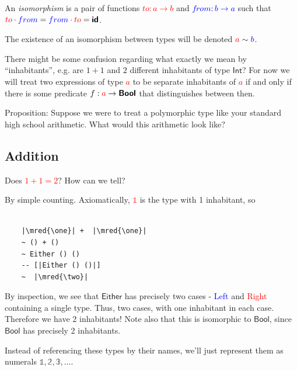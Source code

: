 \documentclass[tikz]{beamer}
\newcommand{\cat}[1]{\bm{ \mathsf{#1} }}
\newcommand{\one}{\bm{\mathbb{1}}}
\newcommand{\two}{\bm{\mathbb{2}}}
\newcommand{\three}{\bm{\mathbb{3}}}
\newcommand{\red}[1]{\textcolor{red}{#1}}
\newcommand{\mred}[1]{\textcolor{red}{$#1$}}
\newcommand{\blue}[1]{\textcolor{blue}{#1}}
\newcommand{\mblue}[1]{\textcolor{blue}{$#1$}}
\theoremstyle{definition}
\begin{document}
\frame
{
	
	\begin{definition}[Isomorphism]
	
		An \textit{isomorphism} is a pair of functions \mred{to : a \to b} and \mblue{from : b \to a} such that $\red{to} \cdot \blue{from} = \blue{from} \cdot \red{to} = \cat{id}$. 
		
		The existence of an isomorphism between types will be denoted $\red{a}  \sim \blue{b}$. 
		
	\end{definition}
}


\frame
{
	There might be some confusion regarding what exactly we mean by “inhabitants”, e.g. are $1 + 1$ and $2$ different inhabitants of type $\cat{Int}$? For now we will treat two expressions of type \mred{a} to be separate inhabitants of \mred{a} if and only if there is some predicate $f : \red{a} \to \cat{Bool}$ that distinguishes between then. 
}

\frame
{ 
	Proposition: Suppose we were to treat a polymorphic type like your standard high school arithmetic. What would this arithmetic look like? 
}

\subsection{Addition}

\frame
{ 
	Does \mred{1 + 1 = 2}? How can we tell? 
}

\begin{frame}[fragile]
	By simple counting. Axiomatically, \mred{\one} is the type with 1 inhabitant, so
	\begin{verbatim}
	
	|\mred{\one}| +  |\mred{\one}|
	~ () + ()
	~ Either () ()
	-- [|Either () ()|]
	~  |\mred{\two}|
	\end{verbatim}
	
\end{frame}

\frame
{ 
	By inspection, we see that $\cat{Either}$ has precisely two cases - \blue{Left} and \red{Right} containing a single type. Thus, two cases, with one inhabitant in each case. Therefore we have 2 inhabitants! Note also that this is isomorphic to $\cat{Bool}$, since $\cat{Bool}$ has precisely 2 inhabitants. 
}

\frame
{
	Instead of referencing these types by their names, we'll just represent them as numerals $\one, \two, \three, \ldots$. 
}
\end{document}
